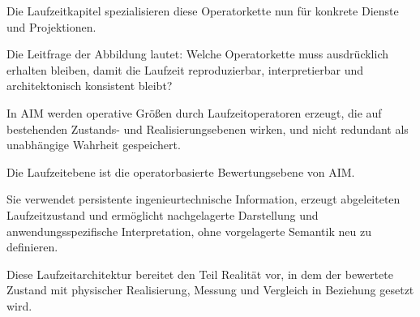 \noindent
Die Laufzeitkapitel spezialisieren diese Operatorkette nun für konkrete
Dienste und Projektionen.

Die Leitfrage der Abbildung lautet: Welche Operatorkette muss ausdrücklich
erhalten bleiben, damit die Laufzeit reproduzierbar, interpretierbar und
architektonisch konsistent bleibt?

\begin{principle}
\label{princ:runtime-layer}
In AIM werden operative Größen durch Laufzeitoperatoren erzeugt, die auf
bestehenden Zustands- und Realisierungsebenen wirken, und nicht redundant als
unabhängige Wahrheit gespeichert.
\end{principle}

\begin{summary}
Die Laufzeitebene ist die operatorbasierte Bewertungsebene von AIM.

Sie verwendet persistente ingenieurtechnische Information, erzeugt
abgeleiteten Laufzeitzustand und ermöglicht nachgelagerte Darstellung und
anwendungsspezifische Interpretation, ohne vorgelagerte Semantik neu zu
definieren.
\end{summary}

Diese Laufzeitarchitektur bereitet den Teil Realität vor, in dem der bewertete
Zustand mit physischer Realisierung, Messung und Vergleich in Beziehung gesetzt
wird.
